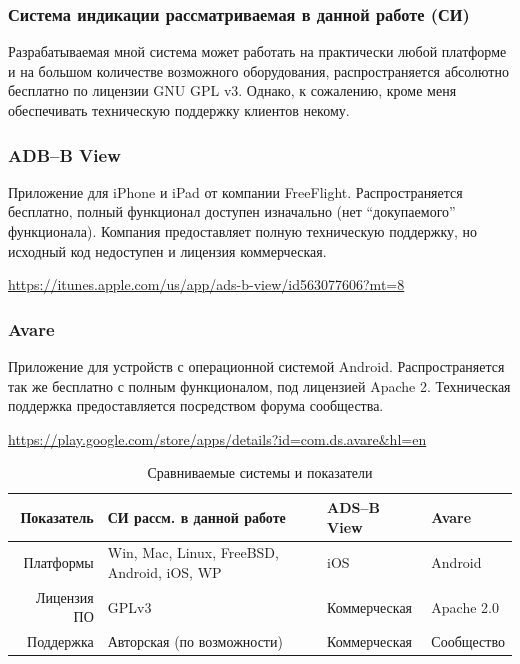 \documentclass[a4paper,12pt]{report} %
\begin{document}
\subsubsection{Система индикации рассматриваемая в данной работе (СИ)}

Разрабатываемая мной система может работать на практически любой платформе и на
большом количестве возможного оборудования, распространяется абсолютно бесплатно
по лицензии GNU GPL v3. Однако, к сожалению, кроме меня обеспечивать техническую
поддержку клиентов некому.

\subsubsection{ADB--B View}

Приложение для iPhone и iPad от компании FreeFlight. Распространяется бесплатно,
полный функционал доступен изначально (нет ``докупаемого'' функционала). Компания предоставляет полную техническую
поддержку, но исходный код недоступен и лицензия коммерческая.

\url{https://itunes.apple.com/us/app/ads-b-view/id563077606?mt=8}

\subsubsection{Avare}

Приложение для устройств с операционной системой Android. Распространяется так
же бесплатно с полным функционалом, под лицензией Apache 2. Техническая
поддержка предоставляется посредством форума сообщества.

\url{https://play.google.com/store/apps/details?id=com.ds.avare&hl=en}


\begin{table}[!h]
  \caption{Сравниваемые системы и показатели}
  \begin{tabular}{ | r | p{6cm} | l | l |}
    \hline
    Показатель   & СИ рассм. в данной работе                  & ADS--B View   & Avare  \\
    \hline
    Платформы    & Win, Mac, Linux, FreeBSD, Android, iOS, WP & iOS           & Android \\
    \hline
    Лицензия ПО  & GPLv3                                      & Коммерческая  & Apache 2.0 \\
    \hline
    Поддержка    & Авторская (по возможности)                 & Коммерческая  & Сообщество \\
    \hline
  \end{tabular}
\end{table}
\end{document}
